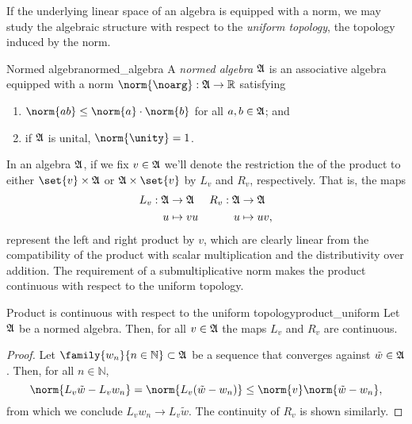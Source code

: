 If the underlying linear space of an algebra is equipped with a norm, we may study the algebraic structure with respect to the \emph{uniform topology}, the topology induced by the norm.
\begin{definition}{Normed algebra}{normed_algebra}
    A \emph{normed algebra} \(\mathfrak{A}\) is an associative algebra equipped with a norm \(\norm{\noarg} : \algebra{A} \to \mathbb{R}\) satisfying
    \begin{enumerate}[label=(\alph*)]
        \item \(\norm{ab} \leq \norm{a}\cdot\norm{b}\) for all \(a,b \in \mathfrak{A}\); and
        \item if \(\mathfrak{A}\) is unital, \(\norm{\unity} = 1\).
    \end{enumerate}
\end{definition}

In an algebra \(\mathfrak{A}\), if we fix \(v \in \mathfrak{A}\) we'll denote the restriction the of the product to either \(\set{v} \times \algebra{A}\) or \(\algebra{A} \times \set{v}\) by \(L_v\) and \(R_v\), respectively. That is, the maps
\begin{align*}
    L_v : \mathfrak{A} &\to \mathfrak{A} &
    R_v : \mathfrak{A} &\to \mathfrak{A}\\
    u &\mapsto vu&
    u &\mapsto uv,
\end{align*}
represent the left and right product by \(v\), which are clearly linear from the compatibility of the product with scalar multiplication and the distributivity over addition. The requirement of a submultiplicative norm makes the product continuous with respect to the uniform topology.
\begin{proposition}{Product is continuous with respect to the uniform topology}{product_uniform}
    Let \(\mathfrak{A}\) be a normed algebra. Then, for all \(v \in \mathfrak{A}\) the maps \(L_v\) and \(R_v\) are continuous.
\end{proposition}
\begin{proof}
    Let \(\family{w_n}{n \in \mathbb{N}} \subset \algebra{A}\) be a sequence that converges against \(\tilde{w} \in \mathfrak{A}\). Then, for all \(n \in \mathbb{N}\),
    \begin{equation*}
        \norm{L_v\tilde{w} - L_vw_n} = \norm{L_v(\tilde{w} - w_n)} \leq \norm{v} \norm{\tilde{w} - w_n},
    \end{equation*}
    from which we conclude \(L_vw_n \to L_v\tilde{w}\). The continuity of \(R_v\) is shown similarly.
\end{proof}

